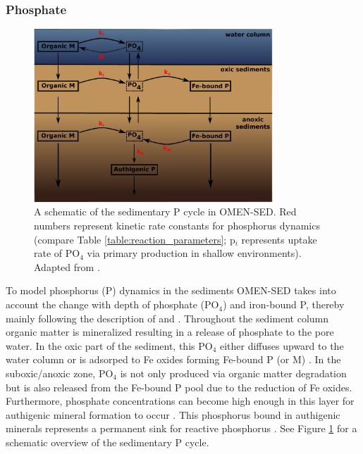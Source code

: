 \documentclass[gmd, manuscript]{copernicus}
\begin{document}
\subsubsection{Phosphate}
\begin{figure}[htbp]
\begin{center}
	\includegraphics[width=0.8\textwidth]{figures/P-cycle.pdf}
	\caption{A schematic of the sedimentary P cycle in OMEN-SED. Red numbers represent kinetic rate constants for phosphorus dynamics (compare Table \ref{table:reaction_parameters}; p$_i$ represents uptake rate of PO$_4$ 
	via primary production in shallow environments). Adapted from \citet{caroline_p_slomp_key_1996}.}
	\label{fig:P-cycle}
	\end{center}
\end{figure}
To model phosphorus (P) dynamics in the sediments OMEN-SED takes into account the change with depth of phosphate (PO$_4$) and iron-bound P, thereby mainly following the description of \citet{caroline_p_slomp_key_1996} 
and \citet{gypens_simple_2008}. Throughout the sediment column organic matter is mineralized resulting in a release of phosphate to the pore water. In the oxic part of the sediment, this PO$_4$ either 
diffuses upward to the water column or is adsorped to Fe oxides forming Fe-bound P (or M) \citep{slomp1998role}. In the suboxic/anoxic zone, PO$_4$ is not only produced via organic matter degradation but is 
also released from the Fe-bound P pool due to the reduction of Fe oxides. Furthermore, phosphate concentrations can become high enough in this layer for authigenic mineral formation to occur \citep{cappellen_mathematical_1988}. 
This phosphorus bound in authigenic minerals represents a permanent sink for reactive phosphorus \citep{caroline_p_slomp_key_1996}. See Figure \ref{fig:P-cycle} for a schematic overview of the sedimentary P cycle. 
\end{document}
